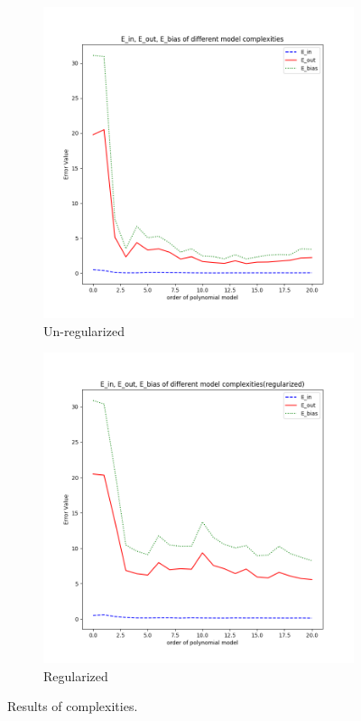 \documentclass[12pt,letterpaper]{article}
\begin{document}
\begin{figure}[h]
\centering
\begin{subfigure}{.45\textwidth}
  \centering
  \includegraphics[width=.9\linewidth]{test_d_noreg.png}
  \caption{\small Un-regularized}
  \label{fig:sub1}
\end{subfigure}
\begin{subfigure}{.45\textwidth}
  \centering
  \includegraphics[width=.9\linewidth]{test_d_regularized.png}
  \caption{\small Regularized}
  \label{fig:sub2}
\end{subfigure}
\caption{\small Results of complexities.}
\label{fig:complex_reg}
\end{figure}
\end{document}
